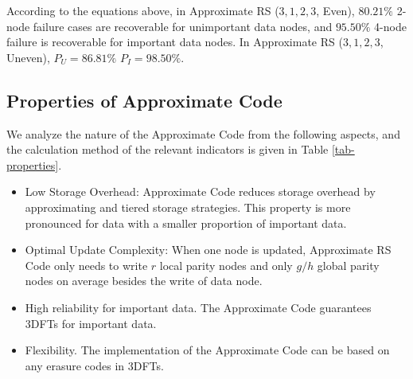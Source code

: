 \documentclass[sigconf]{acmart}
\begin{document}
According to the equations above, in Approximate RS ($3,1,2,3$, Even), $80.21\%$ 2-node failure cases are recoverable for unimportant data nodes, and $95.50\%$ 4-node failure is recoverable for important data nodes. In Approximate RS ($3,1,2,3$, Uneven), $P_U=86.81\%$ $P_{I}=98.50\%$.


\subsection{Properties of Approximate Code}\label{properties}

We analyze the nature of the Approximate Code from the following aspects, and the calculation method of the relevant indicators is given in Table \ref{tab-properties}.
\begin{itemize}
    \item Low Storage Overhead: Approximate Code reduces storage overhead by approximating and tiered storage strategies. This property is more pronounced for data with a smaller proportion of important data.
    \item Optimal Update Complexity: When one node is updated, Approximate RS Code only needs to write $r$ local parity nodes and only $g/h$ global parity nodes on average besides the write of data node.
    \item High reliability for important data. The Approximate Code guarantees 3DFTs for important data.
    \item Flexibility. The implementation of the Approximate Code can be based on any erasure codes in 3DFTs.
\end{itemize}
\end{document}
